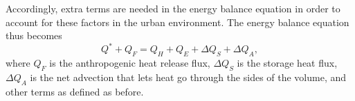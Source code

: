 	Accordingly, extra terms are needed in the energy balance equation in order to account for these factors in the urban environment.
	The energy balance equation thus becomes
	\begin{equation}
		Q^* + Q_F= Q_H + Q_E + \Delta Q_S + \Delta Q_A,
	\end{equation}
	where $Q_F$ is the anthropogenic heat release flux,
	$\Delta Q_S$ is the storage heat flux,
	$\Delta Q_A$ is the net advection that lets heat go through the sides of the volume, and
	other terms as defined as before.
%
%
%	
%	
%
%	
%
%
%	
%
